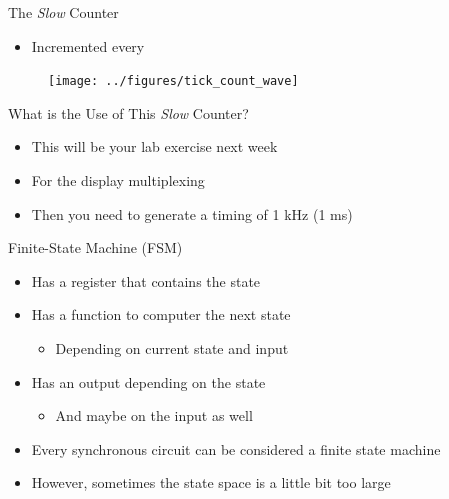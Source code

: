 \begin{frame}[fragile]{The \emph{Slow} Counter}
\begin{itemize}
\item Incremented every 
\end{itemize}
\begin{figure}
  \texttt{[image: ../figures/tick\_count\_wave]}
\end{figure}
\end{frame}

\begin{frame}[fragile]{What is the Use of This \emph{Slow} Counter?}
\begin{itemize}
\item This will be your lab exercise next week
\item For the display multiplexing
\item Then you need to generate a timing of 1 kHz (1 ms)
\end{itemize}
\end{frame}


\begin{frame}[fragile]{Finite-State Machine (FSM)}
\begin{itemize}
\item Has a register that contains the state
\item Has a function to computer the next state
\begin{itemize}
\item Depending on current state and input
\end{itemize}
\item Has an output depending on the state
\begin{itemize}
\item And maybe on the input as well
\end{itemize}
\item Every synchronous circuit can be considered a finite state machine
\item However, sometimes the state space is a little bit too large
\end{itemize}
\end{frame}

